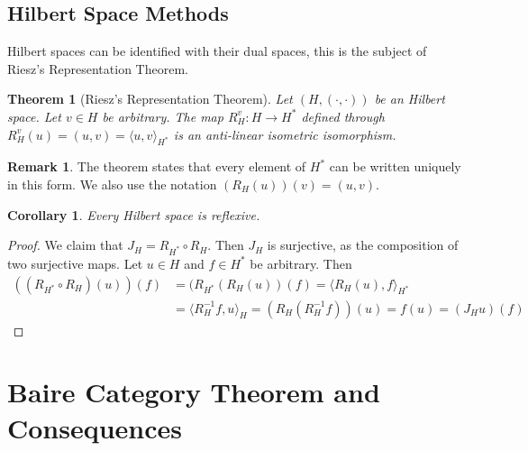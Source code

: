 \documentclass[11pt,a4paper]{article}
\newtheorem{thm}{Theorem}[section]
\newtheorem{cor}{Corollary}[section]
\theoremstyle{definition}
\newtheorem{rem}{Remark}[section]
\begin{document}
\subsection{Hilbert Space Methods}
Hilbert spaces can be identified with their dual spaces, this is the subject of Riesz's Representation Theorem. 
\begin{thm}[Riesz's Representation Theorem] Let $(H,( \cdot , \cdot))$ be an Hilbert space. Let $v \in H$ be arbitrary. The map $R_H^v : H \to H^*$ defined through $R_H^v(u)=(u,v)=\langle u,v\rangle_{H^*}$ is an anti-linear isometric isomorphism. 
\end{thm}
\begin{rem} The theorem states that every element of $H^*$ can be written uniquely in this form. We also use the notation $(R_H(u))(v)=(u,v)$. 
\end{rem}
\newpage
\begin{cor} Every Hilbert space is reflexive.
\end{cor}
\begin{proof}
We claim that $J_H = R_{H^*} \circ R_H$. Then $J_H$ is surjective, as the composition of two surjective maps. Let $u \in H$ and $f \in H^*$ be arbitrary. Then 
\begin{align*}
((R_{H^*} \circ R_H)(u))(f)&= (R_{H^*}(R_H(u))(f)= \langle R_H(u),f \rangle_{H^*} \\
 & = \langle R_H^{-1}f, u \rangle_H = ( R_H(R_H^{-1} f))(u)=f(u)=(J_Hu)(f)
\end{align*}
\end{proof}
\section{Baire Category Theorem and Consequences}
\end{document}
